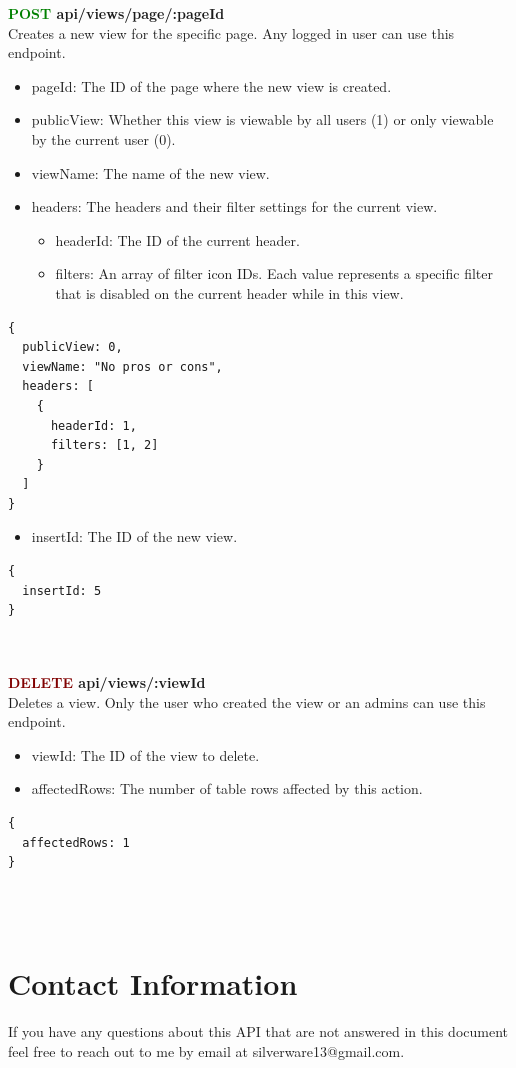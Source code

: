 \documentclass[onecolumn, draftclsnofoot,10pt, compsoc, usenames, dvipsnames]{IEEEtran}
\begin{document}
\noindent
\textbf{\textcolor{Green}{POST} api/views/page/:pageId} \\
Creates a new view for the specific page. Any logged in user can use this endpoint.
\begin{itemize}
    \item pageId: The ID of the page where the new view is created.
    \item publicView: Whether this view is viewable by all users (1) or only viewable by the current user (0).
    \item viewName: The name of the new view.
    \item headers: The headers and their filter settings for the current view.
      \begin{itemize}
        \item headerId: The ID of the current header.
        \item filters: An array of filter icon IDs. Each value represents a specific filter that is disabled on the current header while in this view.
      \end{itemize}
\end{itemize}
\begin{lstlisting}[caption=Example Request Body]
{
  publicView: 0,
  viewName: "No pros or cons",
  headers: [
    {
      headerId: 1,
      filters: [1, 2]
    }
  ]
}
\end{lstlisting}
\begin{itemize}
    \item insertId: The ID of the new view.
\end{itemize}
\begin{lstlisting}[caption=Example Response]
{ 
  insertId: 5
}
\end{lstlisting}
\\~\\


\noindent
\textbf{\textcolor{Maroon}{DELETE} api/views/:viewId} \\
Deletes a view. Only the user who created the view or an admins can use this endpoint.
\begin{itemize}
  \item viewId: The ID of the view to delete.
  \item affectedRows: The number of table rows affected by this action.
\end{itemize}
\begin{lstlisting}[caption=Example Response]
{ 
  affectedRows: 1
}
\end{lstlisting}
\\~\\


\section{Contact Information}
If you have any questions about this API that are not answered in this document feel free to reach out to me by email at silverware13@gmail.com. 
\end{document}
